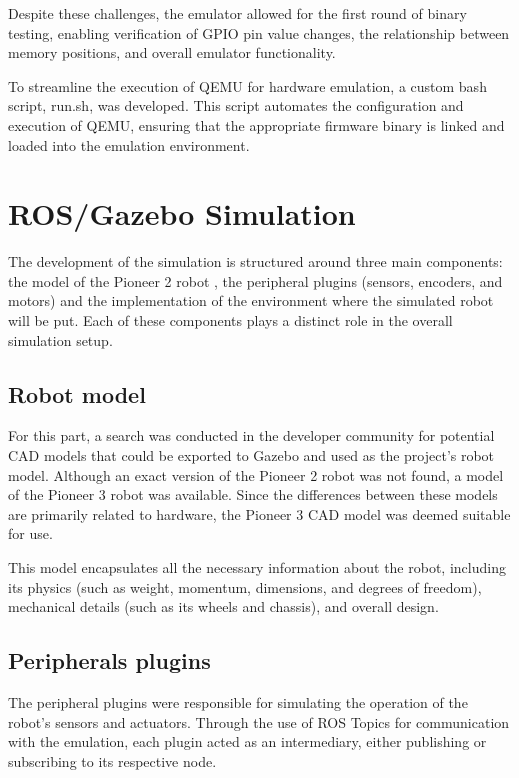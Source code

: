 \documentclass[../../monografia.tex]{subfiles}
\begin{document}
Despite these challenges, the emulator allowed for the first round of binary testing, enabling verification of GPIO pin value changes, the relationship between memory positions, and overall emulator functionality.

To streamline the execution of QEMU for hardware emulation, a custom bash script, run.sh, was developed. This script automates the configuration and execution of QEMU, ensuring that the appropriate firmware binary is linked and loaded into the emulation environment.

\section{ROS/Gazebo Simulation}

The development of the simulation is structured around three main components: the model of the Pioneer 2 robot \cite{pioneer2dx_2024}, the peripheral plugins (sensors, encoders, and motors) and the implementation of the environment where the simulated robot will be put. Each of these components plays a distinct role in the overall simulation setup.

\subsection{Robot model}

For this part, a search was conducted in the developer community for potential CAD models \cite{CAD_23} that could be exported to Gazebo \cite{gazebo_21} and used as the project's robot model. Although an exact version of the Pioneer 2 robot was not found, a model of the Pioneer 3 robot was available. Since the differences between these models are primarily related to hardware, the Pioneer 3 \cite{Pioneer3_23} CAD model was deemed suitable for use.

This model \cite{Pioneer2_CAD_23} encapsulates all the necessary information about the robot, including its physics (such as weight, momentum, dimensions, and degrees of freedom), mechanical details (such as its wheels and chassis), and overall design.
\subsection{Peripherals plugins}

The peripheral plugins were responsible for simulating the operation of the robot's sensors and actuators. Through the use of ROS Topics \cite{ROS_Topics_23} for communication with the emulation, each plugin acted as an intermediary, either publishing or subscribing to its respective node.
\end{document}
